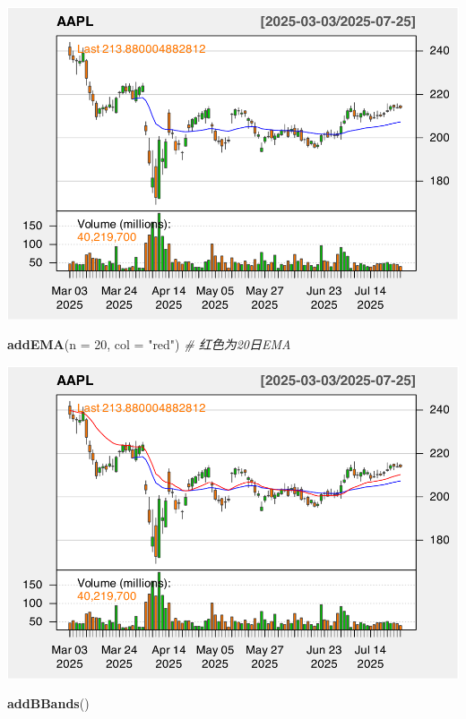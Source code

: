 \documentclass[]{ctexbook}
\newenvironment{Shaded}{\begin{snugshade}}{\end{snugshade}}
\newcommand{\AttributeTok}[1]{\textcolor[rgb]{0.13,0.29,0.53}{#1}}
\newcommand{\CommentTok}[1]{\textcolor[rgb]{0.56,0.35,0.01}{\textit{#1}}}
\newcommand{\DecValTok}[1]{\textcolor[rgb]{0.00,0.00,0.81}{#1}}
\newcommand{\FunctionTok}[1]{\textcolor[rgb]{0.13,0.29,0.53}{\textbf{#1}}}
\newcommand{\NormalTok}[1]{#1}
\newcommand{\StringTok}[1]{\textcolor[rgb]{0.31,0.60,0.02}{#1}}
\begin{document}
\includegraphics[width=0.9\linewidth]{QuantmodHandbook_files/figure-latex/evwma_2-2}

\begin{Shaded}
\begin{Highlighting}[]
\FunctionTok{addEMA}\NormalTok{(}\AttributeTok{n =} \DecValTok{20}\NormalTok{, }\AttributeTok{col =} \StringTok{"red"}\NormalTok{)      }\CommentTok{\# 红色为20日EMA}
\end{Highlighting}
\end{Shaded}

\includegraphics[width=0.9\linewidth]{QuantmodHandbook_files/figure-latex/evwma_2-3}

\begin{Shaded}
\begin{Highlighting}[]
\FunctionTok{addBBands}\NormalTok{()}
\end{Highlighting}
\end{Shaded}
\end{document}
